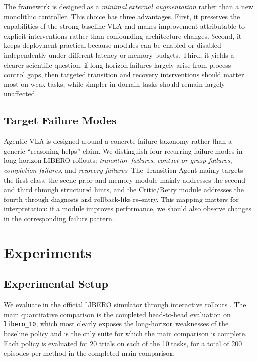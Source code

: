 \documentclass[a4paper]{Template/LaTeX_Templates/waica}
\begin{document}
The framework is designed as a \emph{minimal external augmentation} rather than a new monolithic controller. This choice has three advantages. First, it preserves the capabilities of the strong baseline VLA and makes improvement attributable to explicit interventions rather than confounding architecture changes. Second, it keeps deployment practical because modules can be enabled or disabled independently under different latency or memory budgets. Third, it yields a clearer scientific question: if long-horizon failures largely arise from process-control gaps, then targeted transition and recovery interventions should matter most on weak tasks, while simpler in-domain tasks should remain largely unaffected.

\subsection{Target Failure Modes}

Agentic-VLA is designed around a concrete failure taxonomy rather than a generic ``reasoning helps'' claim. We distinguish four recurring failure modes in long-horizon LIBERO rollouts: \emph{transition failures}, \emph{contact or grasp failures}, \emph{completion failures}, and \emph{recovery failures}. The Transition Agent mainly targets the first class, the scene-prior and memory module mainly addresses the second and third through structured hints, and the Critic/Retry module addresses the fourth through diagnosis and rollback-like re-entry. This mapping matters for interpretation: if a module improves performance, we should also observe changes in the corresponding failure pattern.

\section{Experiments}

\subsection{Experimental Setup}

We evaluate in the official LIBERO simulator through interactive rollouts \cite{libero}. The main quantitative comparison is the completed head-to-head evaluation on \texttt{libero\_10}, which most clearly exposes the long-horizon weaknesses of the baseline policy and is the only suite for which the main comparison is complete. Each policy is evaluated for 20 trials on each of the 10 tasks, for a total of 200 episodes per method in the completed main comparison.
\end{document}
